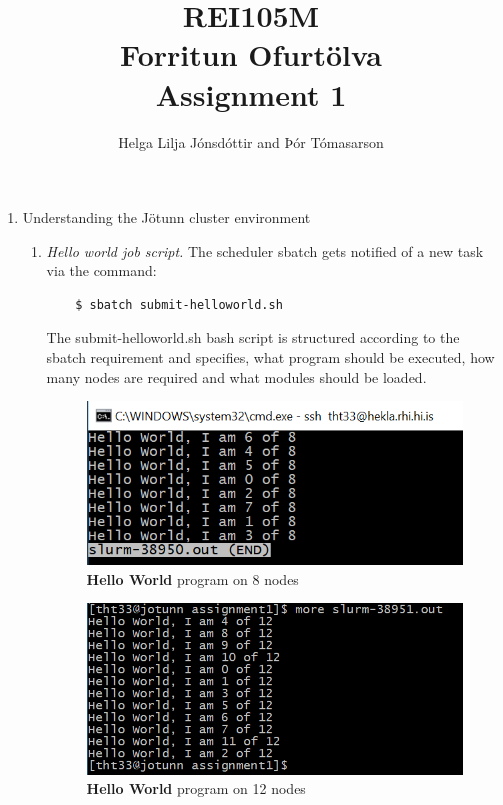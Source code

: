 \documentclass[fontsize=14pt,a4paper]{scrartcl}
\begin{document}
\title{REI105M\\Forritun Ofurtölva\\Assignment 1}
\author{Helga Lilja Jónsdóttir and Þór Tómasarson}
\maketitle
\sloppy

\setlength\parindent{24pt}

\begin{enumerate}
    \item
    Understanding the Jötunn cluster environment
    \begin{enumerate}[label*=\arabic*.]
    \item
    \textit{Hello world job script.}
    The scheduler sbatch gets notified of a new task via the command:
    \begin{lstlisting}
    $ sbatch submit-helloworld.sh
    \end{lstlisting}
    The submit-helloworld.sh bash script is structured according to the sbatch requirement and specifies, what program should be executed, how many nodes are required and what modules should be loaded.
    \begin{figure}[H]
        \centering
        \includegraphics{Images/HelloWorld-8}
        \caption{\textbf{Hello World} program on 8 nodes}
    \end{figure}
    \begin{figure}[H]
        \centering
        \includegraphics[scale=0.8]{Images/HelloWorld-12}
        \caption{\textbf{Hello World} program on 12 nodes}
    \end{figure}


\end{enumerate}
\end{enumerate}
\end{document}
